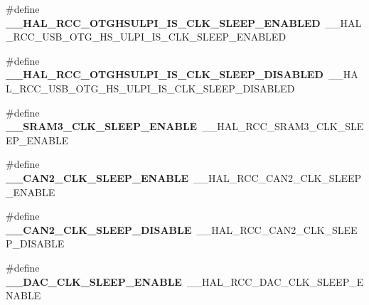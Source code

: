 \begin{DoxyCompactItemize}
\item 
\hypertarget{group___h_a_l___r_c_c___aliased_ga43aa27fabbbe7bf33b77e0e1d8579c55}{\#define {\bfseries \-\_\-\-\_\-\-H\-A\-L\-\_\-\-R\-C\-C\-\_\-\-O\-T\-G\-H\-S\-U\-L\-P\-I\-\_\-\-I\-S\-\_\-\-C\-L\-K\-\_\-\-S\-L\-E\-E\-P\-\_\-\-E\-N\-A\-B\-L\-E\-D}~\-\_\-\-\_\-\-H\-A\-L\-\_\-\-R\-C\-C\-\_\-\-U\-S\-B\-\_\-\-O\-T\-G\-\_\-\-H\-S\-\_\-\-U\-L\-P\-I\-\_\-\-I\-S\-\_\-\-C\-L\-K\-\_\-\-S\-L\-E\-E\-P\-\_\-\-E\-N\-A\-B\-L\-E\-D}\label{group___h_a_l___r_c_c___aliased_ga43aa27fabbbe7bf33b77e0e1d8579c55}

\item 
\hypertarget{group___h_a_l___r_c_c___aliased_gadfa02523b89387ab4a5c377ded562699}{\#define {\bfseries \-\_\-\-\_\-\-H\-A\-L\-\_\-\-R\-C\-C\-\_\-\-O\-T\-G\-H\-S\-U\-L\-P\-I\-\_\-\-I\-S\-\_\-\-C\-L\-K\-\_\-\-S\-L\-E\-E\-P\-\_\-\-D\-I\-S\-A\-B\-L\-E\-D}~\-\_\-\-\_\-\-H\-A\-L\-\_\-\-R\-C\-C\-\_\-\-U\-S\-B\-\_\-\-O\-T\-G\-\_\-\-H\-S\-\_\-\-U\-L\-P\-I\-\_\-\-I\-S\-\_\-\-C\-L\-K\-\_\-\-S\-L\-E\-E\-P\-\_\-\-D\-I\-S\-A\-B\-L\-E\-D}\label{group___h_a_l___r_c_c___aliased_gadfa02523b89387ab4a5c377ded562699}

\item 
\hypertarget{group___h_a_l___r_c_c___aliased_ga81ad4f9659b142d685e57aff534047cc}{\#define {\bfseries \-\_\-\-\_\-\-S\-R\-A\-M3\-\_\-\-C\-L\-K\-\_\-\-S\-L\-E\-E\-P\-\_\-\-E\-N\-A\-B\-L\-E}~\-\_\-\-\_\-\-H\-A\-L\-\_\-\-R\-C\-C\-\_\-\-S\-R\-A\-M3\-\_\-\-C\-L\-K\-\_\-\-S\-L\-E\-E\-P\-\_\-\-E\-N\-A\-B\-L\-E}\label{group___h_a_l___r_c_c___aliased_ga81ad4f9659b142d685e57aff534047cc}

\item 
\hypertarget{group___h_a_l___r_c_c___aliased_ga0ba6af31be85ac831c35647b797b5e7b}{\#define {\bfseries \-\_\-\-\_\-\-C\-A\-N2\-\_\-\-C\-L\-K\-\_\-\-S\-L\-E\-E\-P\-\_\-\-E\-N\-A\-B\-L\-E}~\-\_\-\-\_\-\-H\-A\-L\-\_\-\-R\-C\-C\-\_\-\-C\-A\-N2\-\_\-\-C\-L\-K\-\_\-\-S\-L\-E\-E\-P\-\_\-\-E\-N\-A\-B\-L\-E}\label{group___h_a_l___r_c_c___aliased_ga0ba6af31be85ac831c35647b797b5e7b}

\item 
\hypertarget{group___h_a_l___r_c_c___aliased_ga16eabcc8f86bb233d98aae3e2891fb3d}{\#define {\bfseries \-\_\-\-\_\-\-C\-A\-N2\-\_\-\-C\-L\-K\-\_\-\-S\-L\-E\-E\-P\-\_\-\-D\-I\-S\-A\-B\-L\-E}~\-\_\-\-\_\-\-H\-A\-L\-\_\-\-R\-C\-C\-\_\-\-C\-A\-N2\-\_\-\-C\-L\-K\-\_\-\-S\-L\-E\-E\-P\-\_\-\-D\-I\-S\-A\-B\-L\-E}\label{group___h_a_l___r_c_c___aliased_ga16eabcc8f86bb233d98aae3e2891fb3d}

\item 
\hypertarget{group___h_a_l___r_c_c___aliased_ga9838ddb17caefb289bc820d7725d23d3}{\#define {\bfseries \-\_\-\-\_\-\-D\-A\-C\-\_\-\-C\-L\-K\-\_\-\-S\-L\-E\-E\-P\-\_\-\-E\-N\-A\-B\-L\-E}~\-\_\-\-\_\-\-H\-A\-L\-\_\-\-R\-C\-C\-\_\-\-D\-A\-C\-\_\-\-C\-L\-K\-\_\-\-S\-L\-E\-E\-P\-\_\-\-E\-N\-A\-B\-L\-E}\label{group___h_a_l___r_c_c___aliased_ga9838ddb17caefb289bc820d7725d23d3}


\end{DoxyCompactItemize}

